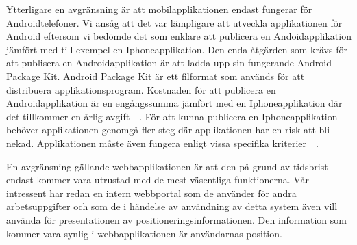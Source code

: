 \documentclass[a4paper,12pt]{article}
\begin{document}
%

Ytterligare en avgränsning är att mobilapplikationen endast fungerar för Androidtelefoner.
Vi ansåg att det var lämpligare att utveckla applikationen för Android eftersom vi bedömde det som enklare att publicera en Andoidapplikation jämfört med till exempel en Iphoneapplikation. Den enda åtgärden som krävs för att publisera en Androidapplikation är att ladda upp sin fungerande Android Package Kit. Android Package Kit är ett filformat som används för att distribuera applikationsprogram. Kostnaden för att publicera en Androidapplikation är en engångssumma jämfört med en Iphoneapplikation där det tillkommer en årlig avgift~\cite{android}~\cite{guidePublish}. För att kunna publicera en Iphoneapplikation behöver applikationen genomgå fler steg där applikationen har en risk att bli nekad. Applikationen måste även fungera enligt vissa specifika kriterier~\cite{submitIphone}~\cite{guidePublish}.

 En avgränsning gällande webbapplikationen är att den på grund av tidsbrist endast kommer vara utrustad med de mest väsentliga funktionerna. Vår intressent har redan en intern webbportal som de använder för andra arbetsuppgifter och som de i händelse av användning av detta system även vill använda för presentationen av positioneringsinformationen. Den information som kommer vara synlig i webbapplikationen är användarnas position.

\end{document}
